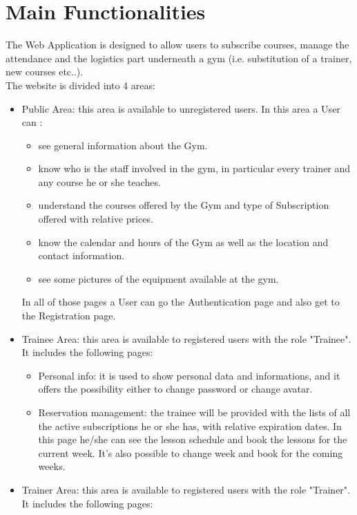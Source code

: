\section{Main Functionalities}

The Web Application is designed to allow users to subscribe courses, manage the attendance and the logistics part underneath a gym (i.e. substitution of a trainer, new courses etc..).\\
The website is divided into 4 areas:

\begin{itemize}
	\item Public Area: this area is available to unregistered users. In this area a User can :
	\begin{itemize}
		\item see general information about the Gym.
		\item know who is the staff involved in the gym, in particular every trainer and any course he or she teaches.
		\item understand the courses offered by the Gym and type of Subscription offered with relative prices.
		\item know the calendar and hours of the Gym as well as the location and contact information.
		\item see some pictures of the equipment available at the gym.
	\end{itemize}	 
	In all of those pages a User can go the Authentication page and also get to the Registration page. 
	\item Trainee Area: this area is available to registered users with the role "Trainee". It includes the following pages:
	\begin{itemize}
		\item Personal info: it is used to show personal data and informations, and it offers the possibility either to change password or change avatar.
		\item Reservation management: the trainee will be provided with the lists of all the active subscriptions he or she has, with relative expiration dates. In this page he/she can see the lesson schedule and book the lessons for the current week. It's also possible to change week and book for the coming weeks.
	\end{itemize}
	\item Trainer Area: this area is available to registered users with the role "Trainer". It includes the following pages:

\end{itemize}

